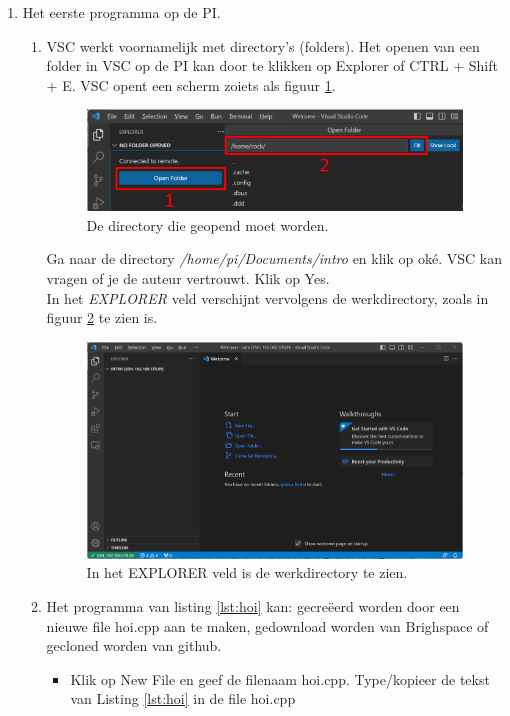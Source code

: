 \begin{enumerate}
\begin{enumerate}
\end{enumerate}  
	     \item Het eerste programma op de PI.
	     \begin{enumerate}
	     	\item VSC werkt voornamelijk met directory's (folders). Het openen van een folder in VSC op de PI kan door te klikken op Explorer  of CTRL + Shift + E. VSC opent een scherm zoiets als figuur \ref{fig:vscOpenFolder}.
		    \begin{figure}[h!]
	\captionsetup{justification=centering}
	\includegraphics[width=0.6 \linewidth]{figuren/VSCopenFolder}
	\centering
	\caption{De directory die geopend moet worden.}
	\label{fig:vscOpenFolder}
\end{figure}
Ga naar de directory \textit{/home/pi/Documents/intro} en klik op oké.
VSC kan vragen of je de auteur vertrouwt. Klik op Yes. \\
 In het \textit{EXPLORER} veld verschijnt vervolgens de werkdirectory, zoals in figuur \ref{fig:vscExploVeld} te zien is.
 	\begin{figure}[h!]
        	\captionsetup{justification=centering}
 	        \includegraphics[width=0.6 \linewidth]{figuren/VSCexplorerveld}
 	        \centering
 	        \caption{In het EXPLORER veld is de werkdirectory te zien.}
 	         \label{fig:vscExploVeld}
     \end{figure} 
\item Het programma van listing \ref{lst:hoi} kan:  gecreëerd worden door een nieuwe file hoi.cpp aan te maken, gedownload worden van Brighspace of gecloned worden van github.
\begin{itemize}
 \item Klik op New File   en geef de filenaam hoi.cpp.
	 Type/kopieer de tekst van Listing \ref{lst:hoi} in de file hoi.cpp
	 

\end{itemize}
\end{enumerate}
\end{enumerate}
